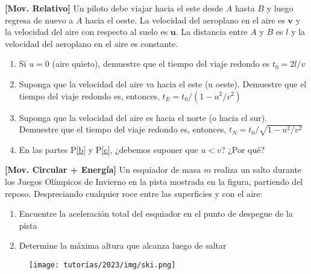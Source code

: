 \documentclass[letterpaper,11pt]{article}
\begin{document}
\vspace{-1cm}
\begin{enumerate}\setlength{\itemsep}{0.4cm}

\item[]

\item \textbf{[Mov. Relativo]} Un piloto debe viajar hacia el este desde $A$ hasta $B$ y luego regresa de nuevo a $A$ hacia el oeste. La velocidad del aeroplano en el aire es $\mathbf{v}$ y la velocidad del aire con respecto al suelo es $\mathbf{u}$. La distancia entre $A$ y $B$ es $l$ y la velocidad del aeroplano en el aire es constante.
    \begin{enumerate}
        \item Si $u=0$ (aire quieto), demuestre que el tiempo del viaje redondo es $t_0 = 2l/v$

        \item \label{b} Suponga que la velocidad del aire va hacia el este (u oeste). Demuestre que el tiempo del viaje redondo es, entonces, $t_E = t_0 / (1 - u^2/v^2)$

        \item \label{c} Suponga que la velocidad del aire es hacia el norte (o hacia el sur). Demuestre que el tiempo del viaje redondo es, entonces, $t_N = t_0 / \sqrt{1 - u^2/v^2}$

        \item En las partes P\ref{b} y P\ref{c}, ¿debemos suponer que $u<v$? ¿Por qué?
    \end{enumerate}

\begin{minipage}{0.7\linewidth}
    \item \textbf{[Mov. Circular + Energía]}  Un esquiador de masa $m$ realiza un salto durante los Juegos Olímpicos de Invierno en la pista mostrada en la figura, partiendo del reposo. Despreciando cualquier roce entre las superficies y con el aire:
    
    \begin{enumerate}
        \item Encuentre la aceleración total del esquiador en el punto de despegue de la pista
    
        \item Determine la máxima altura que alcanza luego de saltar
    \end{enumerate}
\end{minipage}
\hfill
\begin{minipage}{0.22\linewidth}
    \begin{figure}[H]
        \centering
        \texttt{[image: tutorías/2023/img/ski.png]}
    \end{figure}
\end{minipage}


\end{enumerate}
\end{document}
